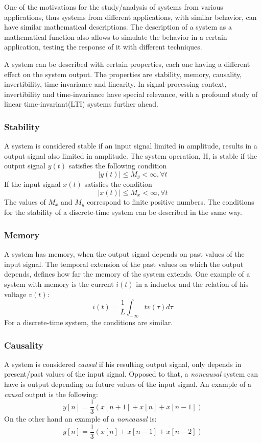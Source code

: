 One of the motivations for the study/analysis of systems from various applications, thus systems from different applications, with similar behavior, can have similar mathematical descriptions. The description of a system as a mathematical function also allows to simulate the behavior in a certain application, testing the response of it with different techniques. 

A system can be described with certain properties, each one having a different effect on the system output. The properties are stability, memory, causality, invertibility, time-invariance and linearity. In signal-processing context, invertibility and time-invariance have special relevance, with a profound study of linear time-invariant(LTI) systems further ahead.\cite{oppenheimSignalsSystems1997}
\subsubsection*{Stability}
A system is considered stable if an input signal limited in amplitude, results in a output signal also limited in amplitude. The system operation, H, is stable if the output signal $y(t)$  satisfies the following condition
\begin{equation}
    |y(t)|\leq M_y < \infty , \forall t
\end{equation}
If the input signal $x(t)$ satisfies the condition
\begin{equation}
    |x(t)|\leq M_x < \infty , \forall t
\end{equation}
The values of $M_x$ and $M_y$ correspond to finite positive numbers. The conditions for the stability of a discrete-time system can be described in the same way.
\subsubsection*{Memory}
A system has memory, when the output signal depends on past values of the input signal. The temporal extension of the past values on which the output depends, defines how far the memory of the system extends. One example of a system with memory is the current $i(t)$ in a inductor and the relation of his voltage $v(t)$:
\begin{equation}
    i(t)=\frac{1}{L}\int_{-\infty}{t}v(\tau)d\tau
\end{equation}
For a discrete-time system, the conditions are similar. 
\subsubsection*{Causality}
A system is considered \textit{causal} if his resulting output signal, only depends in present/past values of the input signal. Opposed to that, a \textit{noncausal} system can have is output depending on future values of the input signal.
An example of a \textit{causal} output is the following:
\begin{equation}
    y[n] = \frac{1}{3}(x[n+1]+x[n]+x[n-1])
\end{equation}
On the other hand an example of a \textit{noncausal} is:
\begin{equation}
    y[n] = \frac{1}{3}(x[n]+x[n-1]+x[n-2])
\end{equation}
